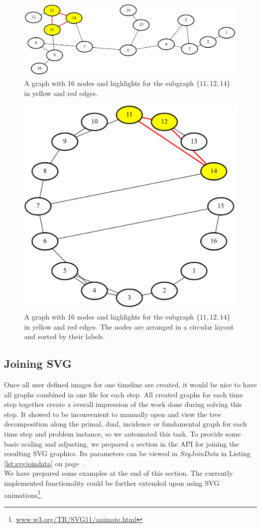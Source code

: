 \documentclass[a4paper, 12pt, bibliography=totoc]{scrartcl}
\begin{document}
\begin{figure}[H]
	\includegraphics[width=\linewidth]{images/minvc16graph9.png}
	\caption[Graph with 16 nodes]{A graph with 16 nodes and highlights for the subgraph $\{11,12,14\}$ in yellow and red edges.}
	\label{fig:minvc16graph9}
\end{figure}

\begin{figure}[H]
	\centering
	\includegraphics[width=0.6\linewidth]{images/minvc16graph9sorted.png}
	\caption[Graph with 16 nodes on a circle]{A graph with 16 nodes and highlights for the subgraph $\{11,12,14\}$ in yellow and red edges. The nodes are arranged in a circular layout and sorted by their labels.}
	\label{fig:minvc16graph9sorted}
\end{figure}

\subsection{Joining SVG}\label{sec:svgjoin}
Once all user defined images for one timeline are created, it would be nice to have all graphs combined in one file for each step. All created graphs for each time step together create a overall impression of the work done during solving this step. It showed to be inconvenient to manually open and view the tree decomposition along the primal, dual, incidence or fundamental graph for each time step and problem instance, so we automated this task.
 To provide some basic scaling and adjusting, we prepared a section in the API for joining the resulting SVG graphics.
Its parameters can be viewed in \textit{SvgJoinData} in Listing \ref{lst:svgjoindata} on page~\pageref{lst:svgjoindata}. \\
We have prepared some examples at the end of this section.
The currently implemented functionality could be further extended upon using SVG animations\footnote{\url{www.w3.org/TR/SVG11/animate.html}}.\\
\end{document}
